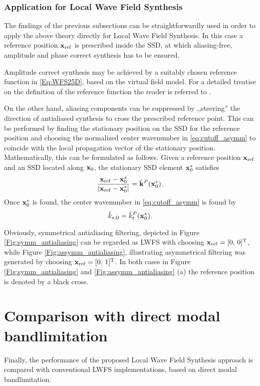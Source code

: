 \documentclass[conference]{IEEEtran}
\begin{document}
\subsubsection{Application for Local Wave Field Synthesis}
The findings of the previous subsections can be straightforwardly used in order to apply the above theory directly for Local Wave Field Synthesis.
In this case a reference position $\mathbf{x}_{\mathrm{ref}}$ is prescribed inside the SSD, at which aliasing-free, amplitude and phase correct synthesis has to be ensured.

Amplitude correct synthesis may be achieved by a suitably chosen reference function in \eqref{Eq:WFS25D}, based on the virtual field model.
For a detailed treatise on the definition of the reference function the reader is referred to \cite{Firtha2019phd}.

On the other hand, aliasing components can be suppressed by ,,steering'' the direction of antialiased synthesis to cross the prescribed reference point.
This can be performed by finding the stationary position on the SSD for the reference position and choosing the normalized center wavenumber in \eqref{eq:cutoff_asymm} to coincide with the local propagation vector of the stationary position.
Mathematically, this can be formulated as follows.
Given a reference position $\mathbf{x}_{\mathrm{ref}}$ and an SSD located along $\mathbf{x}_0$, the stationary SSD element $\mathbf{x}_0^*$ satisfies
\begin{equation}
    \frac{\mathbf{x}_{\mathrm{ref}} - \mathbf{x}_0^*}{\left| \mathbf{x}_{\mathrm{ref}} - \mathbf{x}_0^* \right|} = \hat{\mathbf{k}}^P(\mathbf{x}_0^*).
\end{equation}
Once $\mathbf{x}_0^*$ is found, the center wavenumber in \eqref{eq:cutoff_asymm} is found by
\begin{equation}
    \hat{k}_{s,0} = \hat{k}_t^P(\mathbf{x}_0^*).
\end{equation}

Obviously, symmetrical antialiasing filtering, depicted in Figure \ref{Fig:symm_antialiasing} can be regarded as LWFS with choosing $\mathbf{x}_{\mathrm{ref}} = [0, \, 0]^{\mathrm{T}}$,
while Figure \ref{Fig:assymm_antialiasing}, illustrating asymmetrical filtering was generated by choosing $\mathbf{x}_{\mathrm{ref}} = [0, \, 1]^{\mathrm{T}}$.
In both cases in Figure \ref{Fig:symm_antialiasing} and \ref{Fig:assymm_antialiasing} (a) the reference position is denoted by a black cross.

\section{Comparison with direct modal bandlimitation}
Finally, the performance of the proposed Local Wave Field Synthesis approach is compared with conventional LWFS implementations, based on direct modal bandlimitation.
\end{document}
